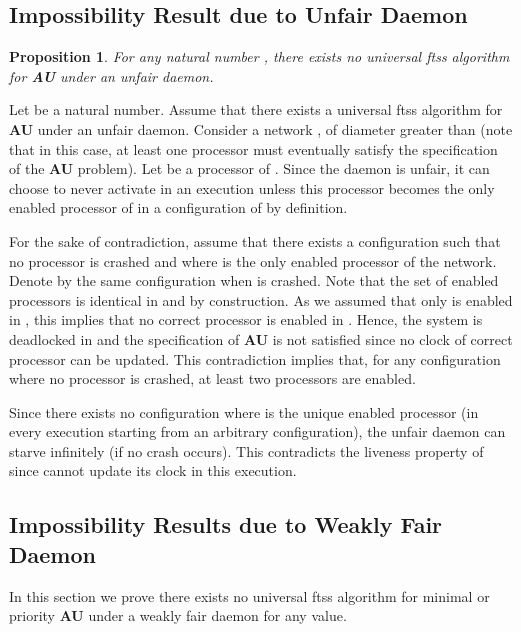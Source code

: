 \documentclass[11pt,english,letterpaper]{article}
\newtheorem{proposition}{Proposition}
\newenvironment{proof}{{\noindent\bf Proof. } }{{\hfill }}
\begin{document}
\subsection{Impossibility Result due to Unfair Daemon}

\begin{proposition}\label{prop:impUF}
For any natural number , there exists no universal ftss algorithm for \textbf{AU} under an unfair daemon.
\end{proposition}

\begin{proof}
Let  be a natural number. Assume that there exists a universal ftss algorithm  for \textbf{AU} under an unfair daemon. Consider a network , of diameter greater than  (note that in this case, at least one processor must eventually satisfy the specification of the \textbf{AU} problem). Let  be a processor of . Since the daemon is unfair, it can choose to never activate  in an execution  unless this processor becomes the only enabled processor of  in a configuration of  by definition.
			
For the sake of contradiction, assume that there exists a configuration  such that no processor is crashed and where  is the only enabled processor of the network. Denote by  the same configuration when  is crashed. Note that the set of enabled processors is identical in  and  by construction. As we assumed that only  is enabled in , this implies that no correct processor is enabled in . Hence, the system is deadlocked in  and the specification of \textbf{AU} is not satisfied since no clock of correct processor can be updated. This contradiction implies that, for any configuration where no processor is crashed, at least two processors are enabled. 

Since there exists no configuration where  is the unique enabled processor (in every execution starting from an arbitrary configuration), the unfair daemon can starve  infinitely (if no crash occurs). This contradicts the liveness property of  since  cannot update its clock in this execution.
\end{proof}

\subsection{Impossibility Results due to Weakly Fair Daemon}

In this section we prove there exists no universal ftss algorithm for minimal or priority \textbf{AU} under a weakly fair daemon for any  value. 
\end{document}
